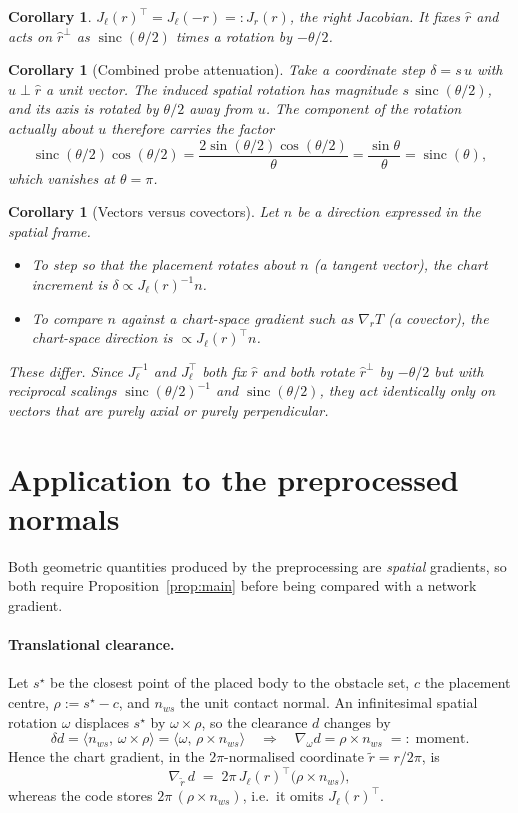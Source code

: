 \documentclass[11pt]{article}
\newtheorem{corollary}[proposition]{Corollary}
\theoremstyle{definition}
\DeclareMathOperator{\sinc}{sinc}
\newcommand{\ip}[2]{\langle #1,\, #2 \rangle}
\newcommand{\Jl}{J_{\ell}}
\newcommand{\Jr}{J_{r}}
\begin{document}
\begin{corollary}
$\Jl(r)^{\!\top} = \Jl(-r) =: \Jr(r)$, the right Jacobian. It fixes $\hat r$ and
acts on $\hat r^{\perp}$ as $\sinc(\theta/2)$ times a rotation by $-\theta/2$.
\end{corollary}

\begin{corollary}[Combined probe attenuation]
Take a coordinate step $\delta = s\,u$ with $u\perp\hat r$ a unit vector. The
induced spatial rotation has magnitude $s\,\sinc(\theta/2)$, and its axis is
rotated by $\theta/2$ away from $u$. The component of the rotation actually
about $u$ therefore carries the factor
\[
  \sinc(\theta/2)\cos(\theta/2)
  = \frac{2\sin(\theta/2)\cos(\theta/2)}{\theta}
  = \frac{\sin\theta}{\theta} = \sinc(\theta),
\]
which vanishes at $\theta=\pi$.
\end{corollary}

\begin{corollary}[Vectors versus covectors]\label{cor:vecvscovec}
Let $n$ be a direction expressed in the spatial frame.
\begin{itemize}
\item To \emph{step} so that the placement rotates about $n$ (a tangent vector),
  the chart increment is $\delta \propto \Jl(r)^{-1} n$.
\item To \emph{compare} $n$ against a chart-space gradient such as
  $\nabla_r T$ (a covector), the chart-space direction is
  $\propto \Jl(r)^{\!\top} n$.
\end{itemize}
These differ. Since $\Jl^{-1}$ and $\Jl^{\!\top}$ both fix $\hat r$ and both
rotate $\hat r^{\perp}$ by $-\theta/2$ but with reciprocal scalings
$\sinc(\theta/2)^{-1}$ and $\sinc(\theta/2)$, they act identically only on
vectors that are purely axial or purely perpendicular.
\end{corollary}

\section{Application to the preprocessed normals}\label{sec:app}

Both geometric quantities produced by the preprocessing are \emph{spatial}
gradients, so both require Proposition~\ref{prop:main} before being compared
with a network gradient.

\paragraph{Translational clearance.}
Let $s^{\star}$ be the closest point of the placed body to the obstacle set,
$c$ the placement centre, $\rho := s^{\star}-c$, and $n_{ws}$ the unit contact
normal. An infinitesimal spatial rotation $\omega$ displaces $s^{\star}$ by
$\omega\times\rho$, so the clearance $d$ changes by
\[
  \delta d = \ip{n_{ws}}{\omega\times\rho} = \ip{\omega}{\rho\times n_{ws}}
  \quad\Longrightarrow\quad
  \nabla_\omega d = \rho\times n_{ws} \;=:\; \mathrm{moment}.
\]
Hence the chart gradient, in the $2\pi$-normalised coordinate
$\tilde r = r/2\pi$, is
\[
  \nabla_{\tilde r}\, d \;=\; 2\pi\,\Jl(r)^{\!\top}\big(\rho\times n_{ws}\big),
\]
whereas the code stores $2\pi\,(\rho\times n_{ws})$, i.e.\ it omits
$\Jl(r)^{\!\top}$.
\end{document}
